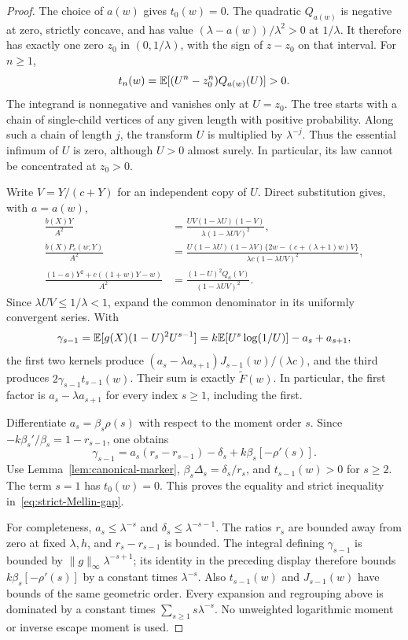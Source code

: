 \begin{proof}
The choice of $a(w)$ gives $t_0(w)=0$. The quadratic $Q_{a(w)}$ is negative
at zero, strictly concave, and has value $(\lambda-a(w))/\lambda^2>0$
at $1/\lambda$.  It therefore has exactly one zero $z_0$ in
$(0,1/\lambda)$, with the sign of $z-z_0$ on that interval.  For
$n\ge1$,
\[
 t_n(w)=\mathbb E[(U^n-z_0^n)Q_{a(w)}(U)]>0.
\]
The integrand is nonnegative and vanishes only at $U=z_0$.
The tree starts with a chain of single-child vertices of any given
length with positive probability. Along such a chain of length $j$,
the transform $U$ is multiplied by $\lambda^{-j}$. Thus the
essential infimum of $U$ is zero, although $U>0$ almost surely. In particular, its law cannot be concentrated at $z_0>0$.

Write $V=Y/(c+Y)$ for an independent copy of $U$.  Direct substitution
gives, with $a=a(w)$,
\begin{align*}
 \frac{b(X)Y}{A^2}
 &=\frac{UV(1-\lambda U)(1-V)}{\lambda(1-\lambda UV)^2},\\
 \frac{b(X)P_c(w;Y)}{A^2}
 &=\frac{U(1-\lambda U)(1-\lambda V)
            \{2w-(c+(\lambda+1)w)V\}}
          {\lambda c(1-\lambda UV)^2},\\
 \frac{(1-a)Y^2+c((1+w)Y-w)}{A^2}
 &=\frac{(1-U)^2Q_a(V)}{(1-\lambda UV)^2}.
\end{align*}
Since $\lambda UV\le1/\lambda<1$, expand the common denominator in
its uniformly convergent series.  With
\[
 \gamma_{s-1}=\mathbb E[g(X)(1-U)^2U^{s-1}]
 =k\mathbb E[U^s\log(1/U)]-a_s+a_{s+1},
\]
the first two kernels produce
$(a_s-\lambda a_{s+1})J_{s-1}(w)/(\lambda c)$, and the third produces
$2\gamma_{s-1}t_{s-1}(w)$.  Their sum is exactly
$\widetilde F(w)$.  In particular, the first factor is
$a_s-\lambda a_{s+1}$ for every index $s\ge1$, including the first.

Differentiate $a_s=\beta_s\rho(s)$ with respect to the moment order $s$.
Since
$-k\beta_s'/\beta_s=1-r_{s-1}$, one obtains
\[
 \gamma_{s-1}=a_s(r_s-r_{s-1})-\delta_s
                    +k\beta_s[-\rho'(s)].
\]
Use Lemma~\ref{lem:canonical-marker},
$\beta_s\Delta_s=\delta_s/r_s$, and $t_{s-1}(w)>0$ for $s\ge2$.
The term $s=1$ has $t_0(w)=0$.  This proves the equality and strict
inequality in~\eqref{eq:strict-Mellin-gap}.

For completeness, $a_s\le\lambda^{-s}$ and
$\delta_s\le\lambda^{-s-1}$.  The ratios $r_s$ are bounded away from
zero at fixed $\lambda,h$, and $r_s-r_{s-1}$ is bounded.  The integral
defining $\gamma_{s-1}$ is bounded by
$\|g\|_\infty\lambda^{-s+1}$; its identity in the preceding display
therefore bounds $k\beta_s[-\rho'(s)]$ by a constant times
$\lambda^{-s}$.  Also $t_{s-1}(w)$ and $J_{s-1}(w)$ have bounds of
the same geometric order.  Every expansion and regrouping above is
dominated by a constant times $\sum_{s\ge1}s\lambda^{-s}$.
No unweighted logarithmic moment or inverse escape moment is used.
\end{proof}
